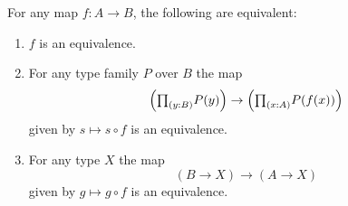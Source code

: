 \begin{thm}\label{ex:equiv_precomp}
For any map $f:A\to B$, the following are equivalent:
\begin{enumerate}
\item $f$ is an equivalence.
\item For any type family $P$ over $B$ the map
\begin{equation*}
\Big(\prd{y:B}P(y)\Big)\to\Big(\prd{x:A}P(f(x))\Big)
\end{equation*}
given by $s\mapsto s\circ f$ is an equivalence.
\item For any type $X$ the map
\begin{equation*}
(B\to X)\to (A\to X)
\end{equation*}
given by $g\mapsto g\circ f$ is an equivalence. 
\end{enumerate}
\end{thm}

